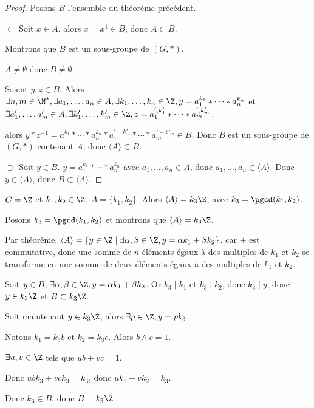 \begin{proof}
    Posons $B$ l'ensemble du théorème précédent. 

    $\subset$ Soit $x \in A$, alors $x = x^1 \in B$, donc $A \subset B$.

    Montrons que $B$ est un sous-groupe de $(G, \ast)$.

    $A \neq \emptyset$ donc $B \neq \emptyset$.

    Soient $y, z \in B$. Alors 
    $\exists n, m \in \N^*, \exists a_1, \ldots, a_n \in A, \exists k_1, \ldots, k_n \in \Z, y = a_1^{k_1} \ast \cdots \ast a_n^{k_n}$
    et $\exists a'_1, \ldots, a'_m \in A, \exists k'_1, \ldots, k'_m \in \Z, z = a_1^{', k'_1} \ast \cdots \ast a_m^{', k'_m}$.

    alors $y \ast z^{-1} = a_1^{k_1} \ast \cdots \ast a_n^{k_n} \ast a_1^{' -k'_1} \ast \cdots \ast a_m^{' -k'_m} \in B$.
    Donc $B$ est un sous-groupe de $(G, \ast)$ contenant $A$, donc $\langle A \rangle \subset B$.

    $\supset$ Soit $y \in B$. 
    $y = a_1^{k_1} \ast \cdots \ast a_n^{k_n}$ avec $a_1, \ldots, a_n \in A$, donc $a_1, \ldots, a_n \in \langle A \rangle$.
    Donc $y \in \langle A \rangle$, donc $B \subset \langle A \rangle$.
\end{proof}

\begin{exemple}
    $G = \Z$ et $k_1, k_2 \in \Z$, $A = \{k_1, k_2\}$. 
    Alors $\langle A \rangle = k_3 \Z$, avec $k_3 = \pgcd(k_1, k_2)$.

    Posons $k_3 = \pgcd(k_1, k_2)$ et montrons que $\langle A \rangle = k_3 \Z$.

    Par théorème, $\langle A \rangle = \{y \in \Z \mid \exists \alpha, \beta \in \Z, y = \alpha k_1 + \beta k_2\}$.
    car $+$ est commutative, donc une somme de $n$ éléments égaux à des multiples de $k_1$ et $k_2$
    se transforme en une somme de deux éléments égaux à des multiples de $k_1$ et $k_2$.

    Soit $y \in B, \, \exists \alpha, \beta \in \Z, y = \alpha k_1 + \beta k_2$. 
    Or $k_3 \mid k_1$ et $k_3 \mid k_2$, donc $k_3 \mid y$, donc $y \in k_3 \Z$ et 
    $B \subset k_3 \Z$.

    Soit maintenant $y \in k_3 \Z$, alors $\exists p \in \Z, y = p k_3$.

    Notons $k_1 = k_3 b$ et $k_2 = k_3 c$. Alors $b \wedge c = 1$.

    $\exists u, v \in \Z$ tels que $ub + vc = 1$.

    Donc $ubk_3 + vck_3 = k_3$, donc $uk_1 + vk_2 = k_3$.

    Donc $k_3 \in B$, donc $B = k_3 \Z$
\end{exemple}

